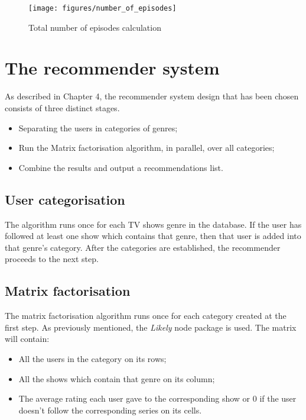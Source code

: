 \begin{figure}[h]
\centering
\texttt{[image: figures/number\_of\_episodes]}
\caption{Total number of episodes calculation}
\label{fig:numberofepisodes}
\end{figure}

\section{The recommender system}

As described in Chapter 4, the recommender system design that has been chosen consists of three distinct stages.

\begin{itemize}
    \item Separating the users in categories of genres;
    \item Run the Matrix factorisation algorithm, in parallel, over all categories;
    \item Combine the results and output a recommendations list.
\end{itemize}

\subsection{User categorisation}

The algorithm runs once for each TV shows genre in the database. If the user has followed at least one show which contains that genre, then that user is added into that genre's category. After the categories are established, the recommender proceeds to the next step.

\subsection{Matrix factorisation}

The matrix factorisation algorithm runs once for each category created at the first step. As previously mentioned, the \textit{Likely} node package is used. The matrix will contain:

\begin{itemize}
    \item All the users in the category on its rows;
    \item All the shows which contain that genre on its column;
    \item The average rating each user gave to the corresponding show or 0 if the user doesn't follow the corresponding series on its cells.
\end{itemize}

